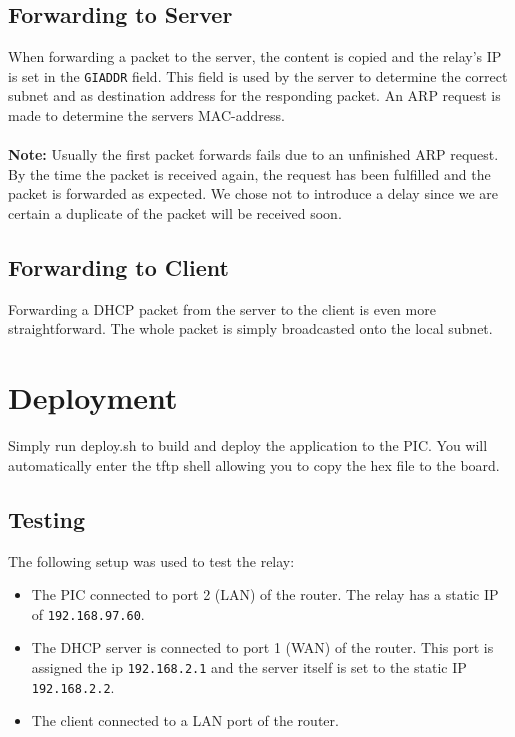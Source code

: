 \documentclass[11pt]{article}
\begin{document}
\subsection{Forwarding to Server}
When forwarding a packet to the server, the content is copied and the relay's IP
is set in the \texttt{GIADDR} field. This field is used by the server to
determine the correct subnet and as destination address for the responding
packet. An ARP request is made to determine the servers MAC-address.\\
\\
\textbf{Note:} Usually the first packet forwards fails due to an unfinished ARP request. By the time the packet is received again, the request has been fulfilled and the packet is forwarded as expected. We chose not to introduce a delay since we are certain a duplicate of the packet will be received soon.

\subsection{Forwarding to Client}
Forwarding a DHCP packet from the server to the client is even more
straightforward. The whole packet is simply broadcasted onto the local subnet.

\section{Deployment}
Simply run deploy.sh to build and deploy the application to the PIC. You will automatically enter the tftp shell allowing you to copy the hex file to the board.

\subsection{Testing}
The following setup was used to test the relay:

\begin{itemize}
	\item The PIC connected to port 2 (LAN) of the router. The relay has a static IP of \texttt{192.168.97.60}.
	\item The DHCP server is connected to port 1 (WAN) of the router. This port is assigned the ip \texttt{192.168.2.1} and the server itself is set to the static IP \texttt{192.168.2.2}.
	\item The client connected to a LAN port of the router.
\end{itemize}
\end{document}
